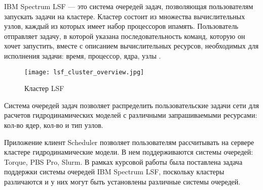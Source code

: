 

IBM Spectrum LSF --- это система очередей задач, позволяющая пользователям запускать задачи на кластере. Кластер состоит из множества вычислительных узлов, каждый из которых имеет набор процессоров ипамять. Пользователь отправляет задачу, в которой указана последовательность команд, которую он хочет запустить, вместе с описанием вычислительных ресурсов, необходимых для исполнения задачи: время, процессор, ядра, узлы \cite{hpc-llnl}.

\begin{figure}[h]
    \centering
    \texttt{[image: lsf\_cluster\_overview.jpg]}
    \caption{Кластер LSF}
    \label{fig:LSF_cluster}
\end{figure}

Система очередей задач позволяет распределить пользовательские задачи сети для расчетов гидродинамических моделей с различными запрашиваемыми ресурсами: кол-во ядер, кол-во и тип узлов.

Приложение клиент Scheduler позволяет пользователям рассчитывать на сервере кластере гидродинамические модели. В нем поддерживаются системы очередей: Torque, PBS Pro, Slurm. В рамках курсовой работы была поставлена задача поддержки системы очередей IBM Spectrum LSF, поскольку кластеры различаются и у них могут быть установлены различные системы очередей.

\clearpage

